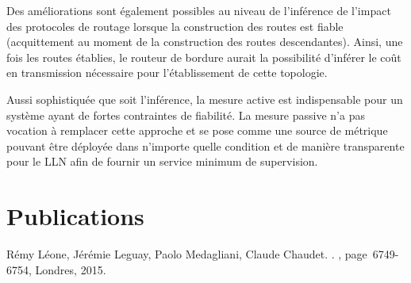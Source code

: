 Des améliorations sont également possibles au niveau de l'inférence de l'impact des protocoles de routage lorsque la construction des routes est fiable (acquittement au moment de la construction des routes descendantes).
Ainsi, une fois les routes établies, le routeur de bordure aurait la possibilité d'inférer le coût en transmission nécessaire pour l'établissement de cette topologie.


Aussi sophistiquée que soit l'inférence, la mesure active est indispensable pour un système ayant de fortes contraintes de fiabilité.
La mesure passive n'a pas vocation à remplacer cette approche et se pose comme une source de métrique pouvant être déployée dans n'importe quelle condition et de manière transparente pour le \ac{LLN} afin de fournir un service minimum de supervision.


\section*{Publications}

  Rémy Léone, Jérémie Leguay, Paolo Medagliani, Claude Chaudet.
    .
    , page~6749-6754, Londres, 2015.